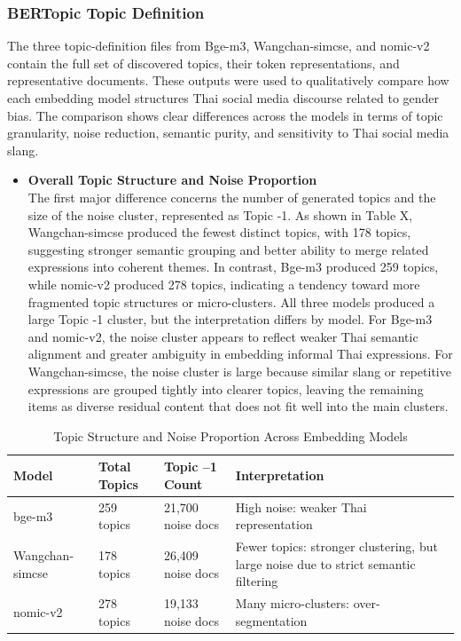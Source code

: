 \documentclass[12pt,oneside,openright,a4paper]{cpe-english-project}
\begin{document}
\subsubsection{BERTopic Topic Definition}

The three topic-definition files from Bge-m3, Wangchan-simcse, and nomic-v2 contain the full set of discovered topics, their token representations, and representative documents. These outputs were used to qualitatively compare how each embedding model structures Thai social media discourse related to gender bias. The comparison shows clear differences across the models in terms of topic granularity, noise reduction, semantic purity, and sensitivity to Thai social media slang.

\begin{itemize}
\item \textbf{Overall Topic Structure and Noise Proportion}\\
The first major difference concerns the number of generated topics and the size of the noise cluster, represented as Topic -1. As shown in Table X, Wangchan-simcse produced the fewest distinct topics, with 178 topics, suggesting stronger semantic grouping and better ability to merge related expressions into coherent themes. In contrast, Bge-m3 produced 259 topics, while nomic-v2 produced 278 topics, indicating a tendency toward more fragmented topic structures or micro-clusters. All three models produced a large Topic -1 cluster, but the interpretation differs by model. For Bge-m3 and nomic-v2, the noise cluster appears to reflect weaker Thai semantic alignment and greater ambiguity in embedding informal Thai expressions. For Wangchan-simcse, the noise cluster is large because similar slang or repetitive expressions are grouped tightly into clearer topics, leaving the remaining items as diverse residual content that does not fit well into the main clusters.
\end{itemize}

\begin{table}[H]
\centering
\small
\caption{Topic Structure and Noise Proportion Across Embedding Models}
\begin{tabularx}{\textwidth}{@{}l l l >{\raggedright\arraybackslash}X@{}}
\toprule
\textbf{Model} & \textbf{Total Topics} & \textbf{Topic --1 Count} & \textbf{Interpretation} \\
\midrule
bge-m3 & 259 topics & 21,700 noise docs & High noise: weaker Thai representation \\
Wangchan-simcse & 178 topics & 26,409 noise docs & Fewer topics: stronger clustering, but large noise due to strict semantic filtering \\
nomic-v2 & 278 topics & 19,133 noise docs & Many micro-clusters: over-segmentation \\
\bottomrule
\end{tabularx}
\end{table}
\end{document}
